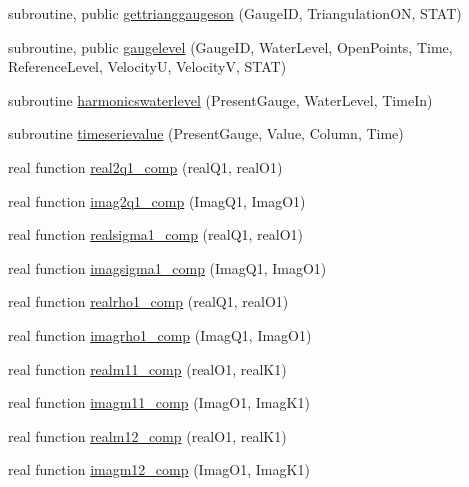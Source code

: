 \begin{DoxyCompactItemize}
\item 
subroutine, public \mbox{\hyperlink{namespacemodulegauge_a0912cebda10faa15469d951016b5db0e}{gettrianggaugeson}} (Gauge\+ID, Triangulation\+ON, S\+T\+AT)
\item 
subroutine, public \mbox{\hyperlink{namespacemodulegauge_a40e51c18500557c90968e17a5ec8a550}{gaugelevel}} (Gauge\+ID, Water\+Level, Open\+Points, Time, Reference\+Level, VelocityU, VelocityV, S\+T\+AT)
\item 
subroutine \mbox{\hyperlink{namespacemodulegauge_a7de5a32e5ee02eaed3c8a598bbb65cb9}{harmonicswaterlevel}} (Present\+Gauge, Water\+Level, Time\+In)
\item 
subroutine \mbox{\hyperlink{namespacemodulegauge_ae7a26f230136e4737c871ba19b1d1529}{timeserievalue}} (Present\+Gauge, Value, Column, Time)
\item 
real function \mbox{\hyperlink{namespacemodulegauge_a3570d6ed4834d7d873f7b068c99c9ef5}{real2q1\+\_\+comp}} (real\+Q1, real\+O1)
\item 
real function \mbox{\hyperlink{namespacemodulegauge_ab71fe2294ae9095789c94992c6add8bf}{imag2q1\+\_\+comp}} (Imag\+Q1, Imag\+O1)
\item 
real function \mbox{\hyperlink{namespacemodulegauge_a639e6e7756ddc09a7f1410460b232db1}{realsigma1\+\_\+comp}} (real\+Q1, real\+O1)
\item 
real function \mbox{\hyperlink{namespacemodulegauge_af07cc0a3df0d15cac79f031de3fb79a7}{imagsigma1\+\_\+comp}} (Imag\+Q1, Imag\+O1)
\item 
real function \mbox{\hyperlink{namespacemodulegauge_aa1a4b7af3abfc8dfce0801b6c016f928}{realrho1\+\_\+comp}} (real\+Q1, real\+O1)
\item 
real function \mbox{\hyperlink{namespacemodulegauge_ab3aa99d6bca64d01ca7e09d41c9bd6f9}{imagrho1\+\_\+comp}} (Imag\+Q1, Imag\+O1)
\item 
real function \mbox{\hyperlink{namespacemodulegauge_a50f7735172ff499a2539356846ac25a7}{realm11\+\_\+comp}} (real\+O1, real\+K1)
\item 
real function \mbox{\hyperlink{namespacemodulegauge_a7beaca7c4aa86b03edc166fe413a4f48}{imagm11\+\_\+comp}} (Imag\+O1, Imag\+K1)
\item 
real function \mbox{\hyperlink{namespacemodulegauge_ae46da4813d3e3f271dc78267bee39db6}{realm12\+\_\+comp}} (real\+O1, real\+K1)
\item 
real function \mbox{\hyperlink{namespacemodulegauge_aa6945b552551befe5db497d61883c814}{imagm12\+\_\+comp}} (Imag\+O1, Imag\+K1)
\item 

\end{DoxyCompactItemize}
